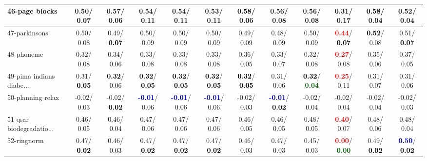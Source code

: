 \begin{table}[h]
\begin{center}
{\begin{tabular}{lc|c|c|c|c|c|c|c|c|c|c}
46-page blocks &   0.50/  0.07 &   0.57/  0.06 &   0.54/  0.11 &   0.54/  0.11 &   0.53/  0.11 & \textcolor{black}{\textbf{  0.58}}/  0.06 &   0.56/  0.08 &   0.56/  0.08 &   0.31/  0.17 & \textcolor{black}{\textbf{  0.58}}/  0.04 &   0.52/  0.04 \\ \hline
47-parkinsons &   0.50/  0.08 &   0.49/\textcolor{black}{\textbf{  0.07}} &   0.50/  0.09 &   0.50/  0.09 &   0.50/  0.09 &   0.49/  0.09 &   0.48/  0.09 &   0.50/  0.09 & \textcolor{red}{\textbf{  0.44}}/\textcolor{black}{\textbf{  0.07}} & \textcolor{black}{\textbf{  0.52}}/  0.08 &   0.51/\textcolor{black}{\textbf{  0.07}} \\
48-phoneme &   0.32/  0.08 &   0.34/  0.06 &   0.33/  0.08 &   0.33/  0.08 &   0.33/  0.08 &   0.36/  0.05 &   0.33/  0.07 &   0.32/  0.08 & \textcolor{red}{\textbf{  0.27}}/  0.08 &   0.35/  0.06 &   0.37/  0.05 \\
49-pima indians diabe... &   0.31/\textcolor{black}{\textbf{  0.05}} & \textcolor{black}{\textbf{  0.32}}/  0.06 & \textcolor{black}{\textbf{  0.32}}/\textcolor{black}{\textbf{  0.05}} & \textcolor{black}{\textbf{  0.32}}/\textcolor{black}{\textbf{  0.05}} & \textcolor{black}{\textbf{  0.32}}/\textcolor{black}{\textbf{  0.05}} & \textcolor{black}{\textbf{  0.32}}/\textcolor{black}{\textbf{  0.05}} &   0.31/  0.06 & \textcolor{black}{\textbf{  0.32}}/\textcolor{darkgreen}{\textbf{  0.04}} & \textcolor{red}{\textbf{  0.25}}/  0.11 &   0.31/  0.07 &   0.31/  0.06 \\
50-planning relax &  -0.02/  0.03 &  -0.02/\textcolor{black}{\textbf{  0.02}} & \textcolor{blue}{\textbf{ -0.01}}/  0.06 & \textcolor{blue}{\textbf{ -0.01}}/  0.06 & \textcolor{blue}{\textbf{ -0.01}}/  0.06 &  -0.02/  0.03 & \textcolor{blue}{\textbf{ -0.01}}/\textcolor{black}{\textbf{  0.02}} &  -0.02/  0.04 &  -0.02/  0.04 &  -0.02/  0.04 &  -0.02/  0.03 \\
51-qsar biodegradatio... &   0.46/  0.05 &   0.46/  0.04 &   0.47/  0.06 &   0.47/  0.06 &   0.47/  0.06 &   0.46/  0.05 &   0.46/  0.05 &   0.48/  0.05 & \textcolor{red}{\textbf{  0.40}}/  0.07 &   0.48/  0.06 &   0.48/  0.04 \\
52-ringnorm &   0.47/\textcolor{black}{\textbf{  0.02}} &   0.46/  0.03 &   0.47/\textcolor{black}{\textbf{  0.02}} &   0.47/\textcolor{black}{\textbf{  0.02}} &   0.47/\textcolor{black}{\textbf{  0.02}} &   0.46/  0.03 &   0.47/  0.03 &   0.45/  0.03 & \textcolor{red}{\textbf{  0.00}}/\textcolor{darkgreen}{\textbf{  0.00}} &   0.49/\textcolor{black}{\textbf{  0.02}} & \textcolor{blue}{\textbf{  0.50}}/\textcolor{black}{\textbf{  0.02}} \\

\end{tabular}}
\end{center}
\end{table}

